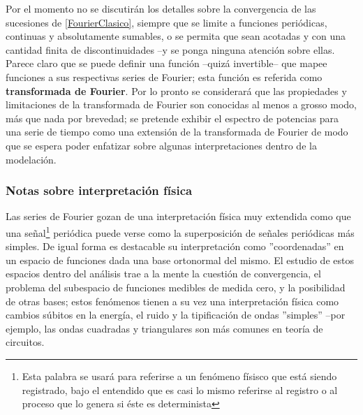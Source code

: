 
Por el momento no se discutir\'an los detalles sobre la convergencia de las sucesiones de 
\ref{FourierClasico}, siempre que se limite a funciones 
peri\'odicas,
continuas y absolutamente sumables,
o se permita que sean acotadas y con
una cantidad finita de discontinuidades --y se ponga ninguna atenci\'on sobre ellas.
Parece claro que se puede definir una funci\'on --quiz\'a invertible-- que mapee funciones 
a sus respectivas series de Fourier;
esta
funci\'on es referida como \textbf{transformada de Fourier}. Por lo pronto se considerar\'a
que las propiedades y limitaciones de la transformada de Fourier son conocidas
al menos a grosso modo, m\'as que nada por brevedad; se pretende exhibir
el espectro de potencias para una serie de tiempo como una extensi\'on de la
transformada de Fourier de modo que se espera
poder enfatizar sobre algunas
interpretaciones dentro de la modelaci\'on.


\subsubsection{Notas sobre interpretaci\'on f\'isica}

Las series de Fourier gozan de una interpretación física muy extendida como que una 
se\~nal\footnote{Esta palabra se usar\'a para referirse a un fen\'omeno f\'isisco 
que est\'a siendo 
registrado, bajo el entendido que es casi lo mismo referirse al registro o al proceso
que lo genera si \'este es determinista}
peri\'odica
puede verse como la superposici\'on de se\~nales peri\'odicas m\'as simples. 
De igual forma es destacable su interpretaci\'on como ''coordenadas'' en un espacio de funciones
dada una base ortonormal del mismo. 
El estudio de estos espacios dentro del an\'alisis trae a la mente
la cuesti\'on de convergencia,
el problema del subespacio de
funciones medibles de medida cero, y la posibilidad de otras bases; estos fen\'omenos tienen a su 
vez una interpretaci\'on f\'isica como cambios s\'ubitos en la energ\'ia, el ruido y la 
tipificaci\'on de ondas ''simples'' --por ejemplo, las ondas cuadradas y triangulares son 
m\'as comunes en teor\'ia de circuitos.

